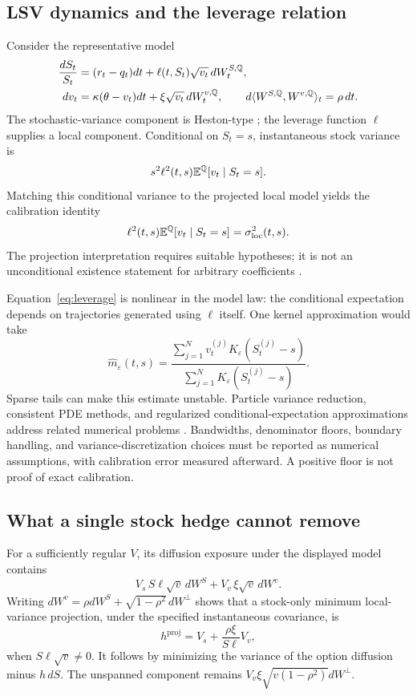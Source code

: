 \subsection{LSV dynamics and the leverage relation}
Consider the representative model
\begin{align}
 \frac{dS_t}{S_t}&=(r_t-q_t)dt+\ell(t,S_t)\sqrt{v_t}\,dW_t^{S,\mathbb Q},\\
 dv_t&=\kappa(\theta-v_t)dt+\xi\sqrt{v_t}\,dW_t^{v,\mathbb Q},\qquad
 d\langle W^{S,\mathbb Q},W^{v,\mathbb Q}\rangle_t=\rho\,dt.
\end{align}
The stochastic-variance component is Heston-type \citep{heston1993}; the leverage function $\ell$ supplies a local component. Conditional on $S_t=s$, instantaneous stock variance is
\[
 s^2\ell^2(t,s)\mathbb E^{\mathbb Q}[v_t\mid S_t=s].
\]
Matching this conditional variance to the projected local model yields the calibration identity
\begin{equation}
 \ell^2(t,s)\mathbb E^{\mathbb Q}[v_t\mid S_t=s]=\sigma_{\mathrm{loc}}^2(t,s).\label{eq:leverage}
\end{equation}
The projection interpretation requires suitable hypotheses; it is not an unconditional existence statement for arbitrary coefficients \citep{gyongy1986,jourdain2020}.

Equation~\eqref{eq:leverage} is nonlinear in the model law: the conditional expectation depends on trajectories generated using $\ell$ itself. One kernel approximation would take
\[
 \widehat m_\varepsilon(t,s)=
 \frac{\sum_{j=1}^N v_t^{(j)}K_\varepsilon(S_t^{(j)}-s)}
      {\sum_{j=1}^N K_\varepsilon(S_t^{(j)}-s)}.
\]
Sparse tails can make this estimate unstable. Particle variance reduction, consistent PDE methods, and regularized conditional-expectation approximations address related numerical problems \citep{cozma2019,wyns2016,bayer2024}. Bandwidths, denominator floors, boundary handling, and variance-discretization choices must be reported as numerical assumptions, with calibration error measured afterward. A positive floor is not proof of exact calibration.

\subsection{What a single stock hedge cannot remove}
For a sufficiently regular $V$, its diffusion exposure under the displayed model contains
\[
 V_s\,S\ell\sqrt v\,dW^S+V_v\,\xi\sqrt v\,dW^v.
\]
Writing $dW^v=\rho dW^S+\sqrt{1-\rho^2}\,dW^\perp$ shows that a stock-only minimum local-variance projection, under the specified instantaneous covariance, is
\begin{equation}
 h^{\mathrm{proj}}=V_s+\frac{\rho\xi}{S\ell}V_v,\label{eq:hedgeprojection}
\end{equation}
when $S\ell\sqrt v\ne0$. It follows by minimizing the variance of the option diffusion minus $h\,dS$. The unspanned component remains
$V_v\xi\sqrt{v(1-\rho^2)}dW^\perp$.


